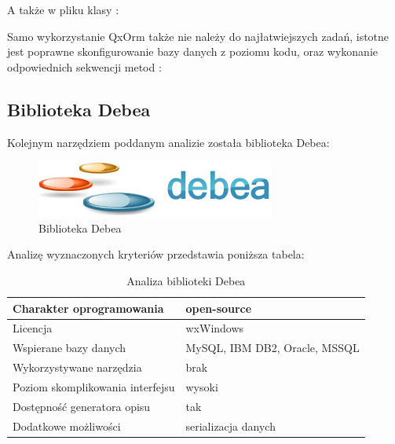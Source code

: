 \documentclass[12pt]{report}
\begin{document}


\newpage

A także w pliku klasy \cite{qxorm}:



Samo wykorzystanie QxOrm także nie należy do najłatwiejszych zadań, istotne jest poprawne skonfigurowanie bazy danych z poziomu kodu, oraz wykonanie odpowiednich
sekwencji metod \cite{qxorm}:



\subsection{Biblioteka Debea}

Kolejnym narzędziem poddanym analizie została biblioteka Debea:

\begin{figure}[h]
\centering
\includegraphics[width=.5\textwidth]{resources/debea.jpg}
\caption[Biblioteka Debea]{Biblioteka Debea \cite{debea}}
\end{figure}

Analizę wyznaczonych kryteriów przedstawia poniższa tabela:

\begin{table}[h]
\centering
\begin{tabular}{| l | l |} 
\hline 
Charakter oprogramowania & open-source \\ \hline
Licencja & wxWindows  \\ \hline
Wspierane bazy danych & MySQL, IBM DB2, Oracle, MSSQL\\ \hline
Wykorzystywane narzędzia & brak  \\ \hline
Poziom skomplikowania interfejsu & wysoki  \\ \hline
Dostępność generatora opisu & tak  \\ \hline
Dodatkowe możliwości &  serializacja danych  \\ \hline
\end{tabular} 
\caption{Analiza biblioteki Debea}
\end{table}
\end{document}
